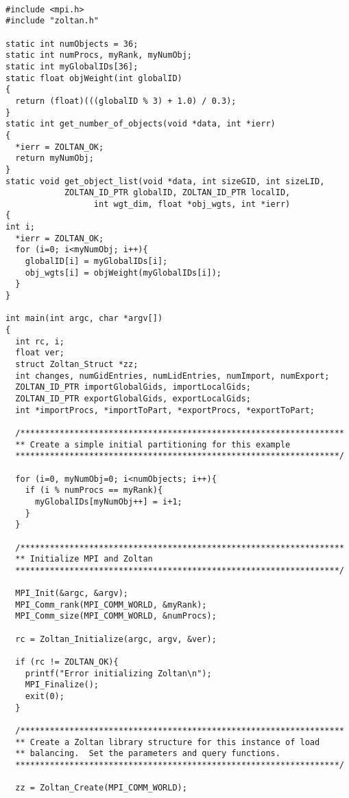 \begin{flushleft}
\begin{verbatim}

#include <mpi.h>
#include "zoltan.h"

static int numObjects = 36;
static int numProcs, myRank, myNumObj;
static int myGlobalIDs[36];
static float objWeight(int globalID)
{
  return (float)(((globalID % 3) + 1.0) / 0.3);
}
static int get_number_of_objects(void *data, int *ierr)
{
  *ierr = ZOLTAN_OK;
  return myNumObj;
}
static void get_object_list(void *data, int sizeGID, int sizeLID,
            ZOLTAN_ID_PTR globalID, ZOLTAN_ID_PTR localID,
                  int wgt_dim, float *obj_wgts, int *ierr)
{
int i;
  *ierr = ZOLTAN_OK;
  for (i=0; i<myNumObj; i++){
    globalID[i] = myGlobalIDs[i];
    obj_wgts[i] = objWeight(myGlobalIDs[i]);
  }
}

int main(int argc, char *argv[])
{
  int rc, i;
  float ver;
  struct Zoltan_Struct *zz;
  int changes, numGidEntries, numLidEntries, numImport, numExport;
  ZOLTAN_ID_PTR importGlobalGids, importLocalGids;
  ZOLTAN_ID_PTR exportGlobalGids, exportLocalGids; 
  int *importProcs, *importToPart, *exportProcs, *exportToPart;

  /******************************************************************
  ** Create a simple initial partitioning for this example
  ******************************************************************/

  for (i=0, myNumObj=0; i<numObjects; i++){
    if (i % numProcs == myRank){
      myGlobalIDs[myNumObj++] = i+1;
    }
  }

  /******************************************************************
  ** Initialize MPI and Zoltan
  ******************************************************************/

  MPI_Init(&argc, &argv);
  MPI_Comm_rank(MPI_COMM_WORLD, &myRank);
  MPI_Comm_size(MPI_COMM_WORLD, &numProcs);

  rc = Zoltan_Initialize(argc, argv, &ver);

  if (rc != ZOLTAN_OK){
    printf("Error initializing Zoltan\n");
    MPI_Finalize();
    exit(0);
  }

  /******************************************************************
  ** Create a Zoltan library structure for this instance of load
  ** balancing.  Set the parameters and query functions.
  ******************************************************************/

  zz = Zoltan_Create(MPI_COMM_WORLD);


\end{verbatim}
\end{flushleft}
